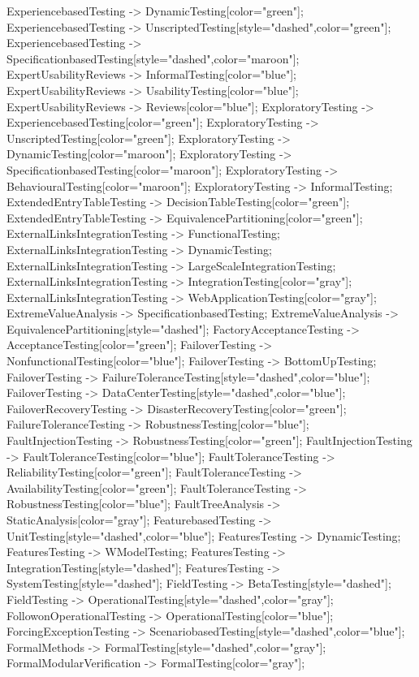 \documentclass{article}
\begin{document}
{ExperiencebasedTesting -> DynamicTesting[color="green"];
ExperiencebasedTesting -> UnscriptedTesting[style="dashed",color="green"];
ExperiencebasedTesting -> SpecificationbasedTesting[style="dashed",color="maroon"];
ExpertUsabilityReviews -> InformalTesting[color="blue"];
ExpertUsabilityReviews -> UsabilityTesting[color="blue"];
ExpertUsabilityReviews -> Reviews[color="blue"];
ExploratoryTesting -> ExperiencebasedTesting[color="green"];
ExploratoryTesting -> UnscriptedTesting[color="green"];
ExploratoryTesting -> DynamicTesting[color="maroon"];
ExploratoryTesting -> SpecificationbasedTesting[color="maroon"];
ExploratoryTesting -> BehaviouralTesting[color="maroon"];
ExploratoryTesting -> InformalTesting;
ExtendedEntryTableTesting -> DecisionTableTesting[color="green"];
ExtendedEntryTableTesting -> EquivalencePartitioning[color="green"];
ExternalLinksIntegrationTesting -> FunctionalTesting;
ExternalLinksIntegrationTesting -> DynamicTesting;
ExternalLinksIntegrationTesting -> LargeScaleIntegrationTesting;
ExternalLinksIntegrationTesting -> IntegrationTesting[color="gray"];
ExternalLinksIntegrationTesting -> WebApplicationTesting[color="gray"];
ExtremeValueAnalysis -> SpecificationbasedTesting;
ExtremeValueAnalysis -> EquivalencePartitioning[style="dashed"];
FactoryAcceptanceTesting -> AcceptanceTesting[color="green"];
FailoverTesting -> NonfunctionalTesting[color="blue"];
FailoverTesting -> BottomUpTesting;
FailoverTesting -> FailureToleranceTesting[style="dashed",color="blue"];
FailoverTesting -> DataCenterTesting[style="dashed",color="blue"];
FailoverRecoveryTesting -> DisasterRecoveryTesting[color="green"];
FailureToleranceTesting -> RobustnessTesting[color="blue"];
FaultInjectionTesting -> RobustnessTesting[color="green"];
FaultInjectionTesting -> FaultToleranceTesting[color="blue"];
FaultToleranceTesting -> ReliabilityTesting[color="green"];
FaultToleranceTesting -> AvailabilityTesting[color="green"];
FaultToleranceTesting -> RobustnessTesting[color="blue"];
FaultTreeAnalysis -> StaticAnalysis[color="gray"];
FeaturebasedTesting -> UnitTesting[style="dashed",color="blue"];
FeaturesTesting -> DynamicTesting;
FeaturesTesting -> WModelTesting;
FeaturesTesting -> IntegrationTesting[style="dashed"];
FeaturesTesting -> SystemTesting[style="dashed"];
FieldTesting -> BetaTesting[style="dashed"];
FieldTesting -> OperationalTesting[style="dashed",color="gray"];
FollowonOperationalTesting -> OperationalTesting[color="blue"];
ForcingExceptionTesting -> ScenariobasedTesting[style="dashed",color="blue"];
FormalMethods -> FormalTesting[style="dashed",color="gray"];
FormalModularVerification -> FormalTesting[color="gray"];
}
\end{document}
